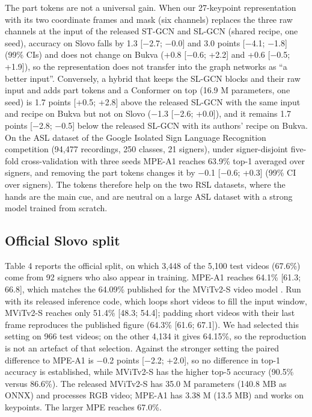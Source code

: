 \documentclass[a4paper,fleqn]{cas-dc}
\begin{document}
The part tokens are not a universal gain. When our 27-keypoint representation with its two coordinate frames and mask (six channels) replaces the three raw channels at the input of the released ST-GCN and SL-GCN (shared recipe, one seed), accuracy on Slovo falls by 1.3 {[}$-$2.7; $-$0.0{]} and 3.0 points {[}$-$4.1; $-$1.8{]} (99\% CIs) and does not change on Bukva (+0.8 {[}$-$0.6; +2.2{]} and +0.6 {[}$-$0.5; +1.9{]}), so the representation does not transfer into the graph networks as ``a better input''. Conversely, a hybrid that keeps the SL-GCN blocks and their raw input and adds part tokens and a Conformer on top (16.9 M parameters, one seed) is 1.7 points {[}+0.5; +2.8{]} above the released SL-GCN with the same input and recipe on Bukva but not on Slovo ($-$1.3 {[}$-$2.6; +0.0{]}), and it remains 1.7 points {[}$-$2.8; $-$0.5{]} below the released SL-GCN with its authors' recipe on Bukva. On the ASL dataset of the Google Isolated Sign Language Recognition competition \cite{2023_kaggle_gislr} (94,477 recordings, 250 classes, 21 signers), under signer-disjoint five-fold cross-validation with three seeds MPE-A1 reaches 63.9\% top-1 averaged over signers, and removing the part tokens changes it by $-$0.1 {[}$-$0.6; +0.3{]} (99\% CI over signers). The tokens therefore help on the two RSL datasets, where the hands are the main cue, and are neutral on a large ASL dataset with a strong model trained from scratch.

\hypertarget{official-slovo-split}{%
\subsection{Official Slovo split}\label{official-slovo-split}}

Table 4 reports the official split, on which 3,448 of the 5,100 test videos (67.6\%) come from 92 signers who also appear in training. MPE-A1 reaches 64.1\% {[}61.3; 66.8{]}, which matches the 64.09\% published for the MViTv2-S video model \cite{2023_kapitanov_slovo}. Run with its released inference code, which loops short videos to fill the input window, MViTv2-S reaches only 51.4\% {[}48.3; 54.4{]}; padding short videos with their last frame reproduces the published figure (64.3\% {[}61.6; 67.1{]}). We had selected this setting on 966 test videos; on the other 4,134 it gives 64.15\%, so the reproduction is not an artefact of that selection. Against the stronger setting the paired difference to MPE-A1 is $-$0.2 points {[}$-$2.2; +2.0{]}, so no difference in top-1 accuracy is established, while MViTv2-S has the higher top-5 accuracy (90.5\% versus 86.6\%). The released MViTv2-S has 35.0 M parameters (140.8 MB as ONNX) and processes RGB video; MPE-A1 has 3.38 M (13.5 MB) and works on keypoints. The larger MPE reaches 67.0\%.
\end{document}

